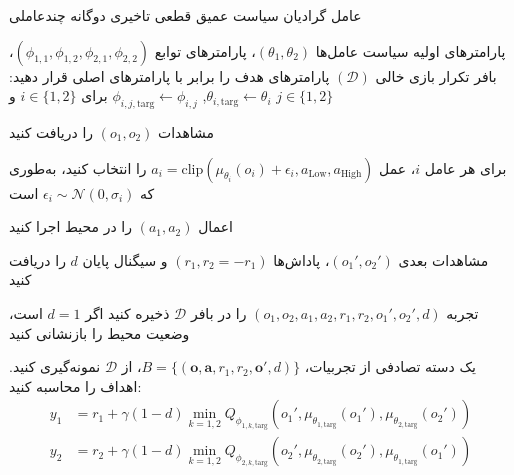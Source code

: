 \begin{algorithm}[H]
    \caption{عامل گرادیان سیاست عمیق قطعی تاخیری دوگانه چند­عاملی}\label{alg:MA-TD3}
    \begin{algorithmic}[1]
         پارامترهای اولیه سیاست عامل‌ها $(\theta_1, \theta_2)$، پارامترهای توابع  $(\phi_{1,1}, \phi_{1,2}, \phi_{2,1}, \phi_{2,2})$، بافر تکرار بازی خالی $(\mathcal{D})$
        \State پارامترهای هدف را برابر با پارامترهای اصلی قرار دهید: 
        \Statex \hspace{\algorithmicindent}
        $\theta_{i,\text{targ}} \leftarrow \theta_i$, $\phi_{i,j,\text{targ}} \leftarrow \phi_{i,j}$ برای $i \in \{1, 2\}$ و $j \in \{1, 2\}$
        
            \State \parbox[t]{\dimexpr\linewidth-\algorithmicindent}{
            مشاهدات $(o_1, o_2)$ را دریافت کنید
            \strut}
            \State \parbox[t]{\dimexpr\linewidth-\algorithmicindent}{
            برای هر عامل $i$، عمل $a_i = \text{clip}(\mu_{\theta_i}(o_i) + \epsilon_i, a_{\text{Low}}, a_{\text{High}})$ را انتخاب کنید، به‌طوری که $\epsilon_i \sim \mathcal{N}(0, \sigma_i)$ است
            \strut}
            \State اعمال $(a_1, a_2)$ را در محیط اجرا کنید
            \State \parbox[t]{\dimexpr\linewidth-\algorithmicindent}{
            مشاهدات بعدی $(o_1', o_2')$، پاداش‌ها $(r_1, r_2=-r_1)$ و سیگنال پایان $d$ را دریافت کنید
            \strut}
            \State تجربه $(o_1, o_2, a_1, a_2, r_1, r_2, o_1', o_2', d)$ را در بافر $\mathcal{D}$ ذخیره کنید
            \State اگر $d=1$ است، وضعیت محیط را بازنشانی کنید
            
                    \State %
                    یک دسته تصادفی از تجربیات، $B = \{(\boldsymbol{o}, \boldsymbol{a}, r_1, r_2, \boldsymbol{o}', d)\}$، از $\mathcal{D}$ نمونه‌گیری کنید.
                    \State اهداف را محاسبه کنید:
                     \vspace{-15pt}
                    \begin{align*}
                        y_1 &= r_1 + \gamma (1-d) \min_{k=1,2} Q_{\phi_{1,k,\text{targ}}}(o_1', \mu_{\theta_{1,\text{targ}}}(o_1'), \mu_{\theta_{2,\text{targ}}}(o_2')) \\
                        y_2 &= r_2 + \gamma (1-d) \min_{k=1,2} Q_{\phi_{2,k,\text{targ}}}(o_2', \mu_{\theta_{2,\text{targ}}}(o_2'), \mu_{\theta_{1,\text{targ}}}(o_1'))
                    \end{align*}
                    \vspace{-35pt}
                    

\end{algorithmic}
\end{algorithm}
